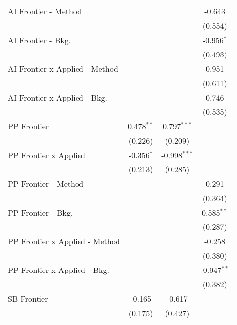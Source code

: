 \begin{tabular}{lccc}
   AI Frontier - Method           &               &                & -0.643\\   
                                  &               &                & (0.554)\\   
   AI Frontier - Bkg.             &               &                & -0.956$^{*}$\\   
                                  &               &                & (0.493)\\   
   AI Frontier x Applied - Method &               &                & 0.951\\   
                                  &               &                & (0.611)\\   
   AI Frontier x Applied - Bkg.   &               &                & 0.746\\   
                                  &               &                & (0.535)\\   
   PP Frontier                    & 0.478$^{**}$  & 0.797$^{***}$  &   \\   
                                  & (0.226)       & (0.209)        &   \\   
   PP Frontier x Applied          & -0.356$^{*}$  & -0.998$^{***}$ &   \\   
                                  & (0.213)       & (0.285)        &   \\   
   PP Frontier - Method           &               &                & 0.291\\   
                                  &               &                & (0.364)\\   
   PP Frontier - Bkg.             &               &                & 0.585$^{**}$\\   
                                  &               &                & (0.287)\\   
   PP Frontier x Applied - Method &               &                & -0.258\\   
                                  &               &                & (0.380)\\   
   PP Frontier x Applied - Bkg.   &               &                & -0.947$^{**}$\\   
                                  &               &                & (0.382)\\   
   SB Frontier                    & -0.165        & -0.617         &   \\   
                                  & (0.175)       & (0.427)        &   \\   

\end{tabular}
